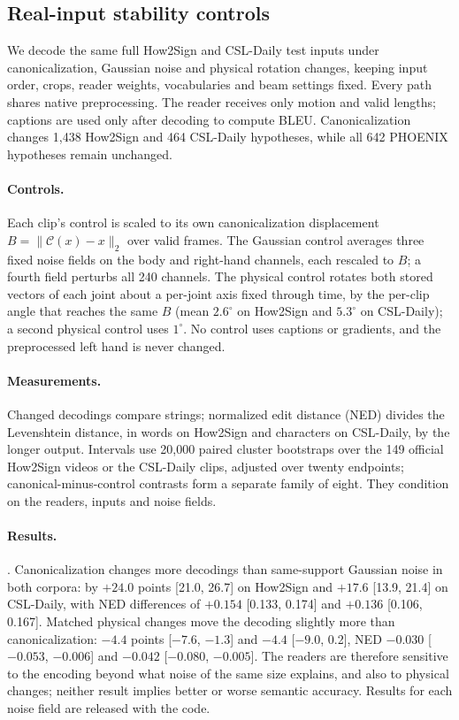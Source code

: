 \documentclass[10pt,twocolumn,letterpaper]{article}
\newcommand{\C}{\mathcal{C}}\newcommand{\G}{\mathcal{G}}\newcommand{\R}{\mathbb{R}}
\begin{document}
\subsection{Real-input stability controls}\label{sec:signstability}
We decode the same full How2Sign and CSL-Daily test inputs under canonicalization, Gaussian noise and physical rotation changes, keeping input order, crops, reader weights, vocabularies and beam settings fixed. Every path shares native preprocessing. The reader receives only motion and valid lengths; captions are used only after decoding to compute BLEU. Canonicalization changes 1,438 How2Sign and 464 CSL-Daily hypotheses, while all 642 PHOENIX hypotheses remain unchanged.

\paragraph{Controls.} Each clip's control is scaled to its own canonicalization displacement $B=\|\C(x)-x\|_2$ over valid frames. The Gaussian control averages three fixed noise fields on the body and right-hand channels, each rescaled to $B$; a fourth field perturbs all 240 channels. The physical control rotates both stored vectors of each joint about a per-joint axis fixed through time, by the per-clip angle that reaches the same $B$ (mean $2.6^\circ$ on How2Sign and $5.3^\circ$ on CSL-Daily); a second physical control uses $1^\circ$. No control uses captions or gradients, and the preprocessed left hand is never changed.



\paragraph{Measurements.} Changed decodings compare strings; normalized edit distance (NED) divides the Levenshtein distance, in words on How2Sign and characters on CSL-Daily, by the longer output. Intervals use 20,000 paired cluster bootstraps over the 149 official How2Sign videos or the CSL-Daily clips, adjusted over twenty endpoints; canonical-minus-control contrasts form a separate family of eight. They condition on the readers, inputs and noise fields.

\paragraph{Results.} . Canonicalization changes more decodings than same-support Gaussian noise in both corpora: by $+24.0$ points [21.0, 26.7] on How2Sign and $+17.6$ [13.9, 21.4] on CSL-Daily, with NED differences of $+0.154$ [0.133, 0.174] and $+0.136$ [0.106, 0.167]. Matched physical changes move the decoding slightly more than canonicalization: $-4.4$ points [$-7.6$, $-1.3$] and $-4.4$ [$-9.0$, 0.2], NED $-0.030$ [$-0.053$, $-0.006$] and $-0.042$ [$-0.080$, $-0.005$]. The readers are therefore sensitive to the encoding beyond what noise of the same size explains, and also to physical changes; neither result implies better or worse semantic accuracy. Results for each noise field are released with the code.
\end{document}
